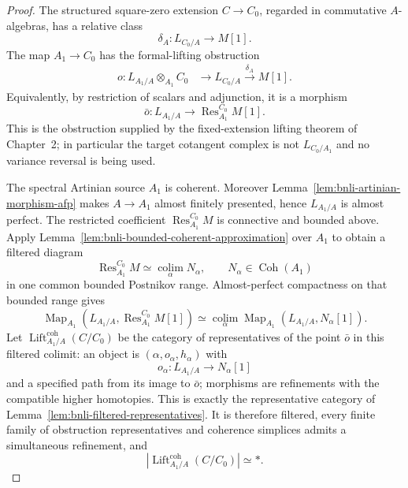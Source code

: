\begin{proof}
The structured square-zero extension $C\to C_0$, regarded in commutative
$A$-algebras, has a relative class
\[
    \delta_A:L_{C_0/A}\longrightarrow M[1].
\]
The map $A_1\to C_0$ has the formal-lifting obstruction
\[
\begin{aligned}
    o:
    L_{A_1/A}\otimes_{A_1}C_0
    &\longrightarrow L_{C_0/A}
    \xrightarrow{\delta_A}M[1].
\end{aligned}
\]
Equivalently, by restriction of scalars and adjunction, it is a morphism
\[
\boxed{
    \bar o:L_{A_1/A}
    \longrightarrow
    \operatorname{Res}^{C_0}_{A_1}M[1].}
\]
This is the obstruction supplied by the fixed-extension lifting theorem of
Chapter~2; in particular the target cotangent complex is not
$L_{C_0/A_1}$ and no variance reversal is being used.

The spectral Artinian source $A_1$ is coherent.  Moreover
Lemma~\ref{lem:bnli-artinian-morphism-afp} makes $A\to A_1$ almost finitely
presented, hence $L_{A_1/A}$ is almost perfect.  The restricted coefficient
$\operatorname{Res}^{C_0}_{A_1}M$ is connective and bounded above.  Apply
Lemma~\ref{lem:bnli-bounded-coherent-approximation} over $A_1$ to obtain a
filtered diagram
\[
    \operatorname{Res}^{C_0}_{A_1}M
    \simeq
    \operatorname*{colim}_{\alpha}N_\alpha,
    \qquad
    N_\alpha\in\operatorname{Coh}(A_1)
\]
in one common bounded Postnikov range.  Almost-perfect compactness on that
bounded range gives
\[
\boxed{
    \operatorname{Map}_{A_1}
    \left(L_{A_1/A},\operatorname{Res}^{C_0}_{A_1}M[1]\right)
    \simeq
    \operatorname*{colim}_{\alpha}
    \operatorname{Map}_{A_1}(L_{A_1/A},N_\alpha[1]).}
\]
Let $\operatorname{Lift}^{\mathrm{coh}}_{A_1/A}(C/C_0)$ be the category of
representatives of the point $\bar o$ in this filtered colimit: an object is
$(\alpha,o_\alpha,h_\alpha)$ with
\[
    o_\alpha:L_{A_1/A}\longrightarrow N_\alpha[1]
\]
and a specified path from its image to $\bar o$; morphisms are refinements
with the compatible higher homotopies.  This is exactly the representative
category of Lemma~\ref{lem:bnli-filtered-representatives}.  It is therefore
filtered, every finite family of obstruction representatives and coherence
simplices admits a simultaneous refinement, and
\[
\boxed{
    \left|
      \operatorname{Lift}^{\mathrm{coh}}_{A_1/A}(C/C_0)
    \right|\simeq *.}
\]


\end{proof}
